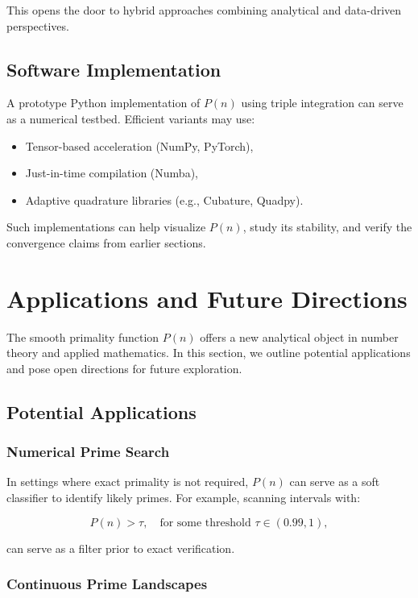 \documentclass[12pt]{article}
\theoremstyle{definition}
\theoremstyle{plain}
\theoremstyle{remark}
\begin{document}
This opens the door to hybrid approaches combining analytical and data-driven perspectives.

\subsection{Software Implementation}

A prototype Python implementation of \( P(n) \) using triple integration can serve as a numerical testbed. Efficient variants may use:

\begin{itemize}
  \item Tensor-based acceleration (NumPy, PyTorch),
  \item Just-in-time compilation (Numba),
  \item Adaptive quadrature libraries (e.g., Cubature, Quadpy).
\end{itemize}

Such implementations can help visualize \( P(n) \), study its stability, and verify the convergence claims from earlier sections.

\section{Applications and Future Directions}

The smooth primality function \( P(n) \) offers a new analytical object in number theory and applied mathematics. In this section, we outline potential applications and pose open directions for future exploration.

\subsection{Potential Applications}

\subsubsection{Numerical Prime Search}

In settings where exact primality is not required, \( P(n) \) can serve as a soft classifier to identify likely primes. For example, scanning intervals with:

\[
P(n) > \tau, \quad \text{for some threshold } \tau \in (0.99, 1),
\]

can serve as a filter prior to exact verification.

\subsubsection{Continuous Prime Landscapes}
\end{document}
